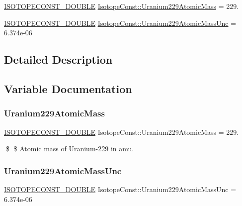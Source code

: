 \begin{DoxyCompactItemize}
\item 
\mbox{\hyperlink{group___isotope_const-_macros_ga8f45a7272ce02c0b4c65c44636ed719a}{I\+S\+O\+T\+O\+P\+E\+C\+O\+N\+S\+T\+\_\+\+D\+O\+U\+B\+LE}} \mbox{\hyperlink{group___isotope_const-_uranium-_u229_ga691aa60a558110511b34a53e5704e914}{Isotope\+Const\+::\+Uranium229\+Atomic\+Mass}} = 229.
\item 
\mbox{\hyperlink{group___isotope_const-_macros_ga8f45a7272ce02c0b4c65c44636ed719a}{I\+S\+O\+T\+O\+P\+E\+C\+O\+N\+S\+T\+\_\+\+D\+O\+U\+B\+LE}} \mbox{\hyperlink{group___isotope_const-_uranium-_u229_gaca20b12a1e9a22eeb4fcb1f0f097c86c}{Isotope\+Const\+::\+Uranium229\+Atomic\+Mass\+Unc}} = 6.\+374e-\/06
\end{DoxyCompactItemize}


\subsection{Detailed Description}


\subsection{Variable Documentation}
\mbox{\label{group___isotope_const-_uranium-_u229_ga691aa60a558110511b34a53e5704e914}} 
\subsubsection{\texorpdfstring{Uranium229\+Atomic\+Mass}{Uranium229AtomicMass}}
{\footnotesize\ttfamily \mbox{\hyperlink{group___isotope_const-_macros_ga8f45a7272ce02c0b4c65c44636ed719a}{I\+S\+O\+T\+O\+P\+E\+C\+O\+N\+S\+T\+\_\+\+D\+O\+U\+B\+LE}} Isotope\+Const\+::\+Uranium229\+Atomic\+Mass = 229.}

\$ \$ Atomic mass of Uranium-\/229 in amu. \mbox{\label{group___isotope_const-_uranium-_u229_gaca20b12a1e9a22eeb4fcb1f0f097c86c}} 
\subsubsection{\texorpdfstring{Uranium229\+Atomic\+Mass\+Unc}{Uranium229AtomicMassUnc}}
{\footnotesize\ttfamily \mbox{\hyperlink{group___isotope_const-_macros_ga8f45a7272ce02c0b4c65c44636ed719a}{I\+S\+O\+T\+O\+P\+E\+C\+O\+N\+S\+T\+\_\+\+D\+O\+U\+B\+LE}} Isotope\+Const\+::\+Uranium229\+Atomic\+Mass\+Unc = 6.\+374e-\/06}

